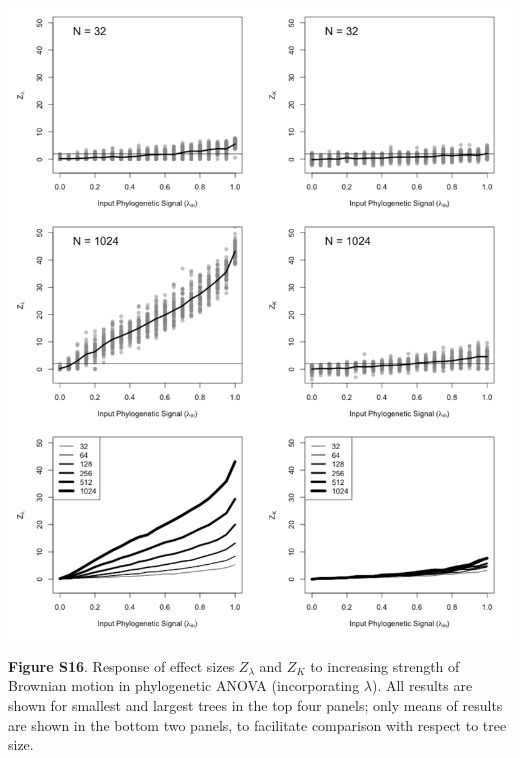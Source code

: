 \documentclass[
]{article}
\begin{document}
\includegraphics[width=0.95\linewidth]{fig.S16}

\textbf{Figure S16}. Response of effect sizes \(Z_{\lambda}\) and
\(Z_K\) to increasing strength of Brownian motion in phylogenetic ANOVA
(incorporating \(\lambda\)). All results are shown for smallest and
largest trees in the top four panels; only means of results are shown in
the bottom two panels, to facilitate comparison with respect to tree
size.
\end{document}
